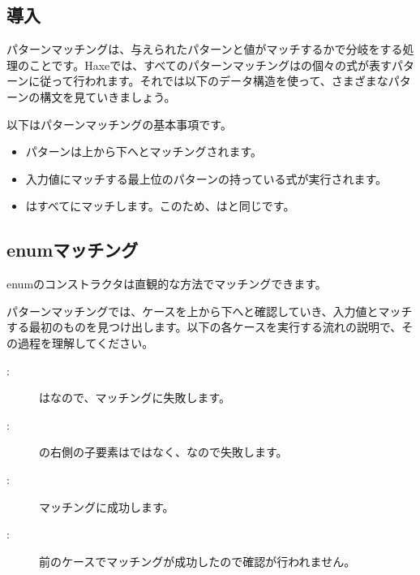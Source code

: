 \subsection{導入}
\label{lf-pattern-matching-introduction}

パターンマッチングは、与えられたパターンと値がマッチするかで分岐をする処理のことです。Haxeでは、すべてのパターンマッチングはの個々の式が表すパターンに従って行われます。それでは以下のデータ構造を使って、さまざまなパターンの構文を見ていきましょう。


以下はパターンマッチングの基本事項です。

\begin{itemize}
	\item パターンは上から下へとマッチングされます。
	\item 入力値にマッチする最上位のパターンの持っている式が実行されます。
	\item \expr{_}はすべてにマッチします。このため、はと同じです。
\end{itemize}

\subsection{enumマッチング}
\label{lf-pattern-matching-enums}

enumのコンストラクタは直観的な方法でマッチングできます。


パターンマッチングでは、ケースを上から下へと確認していき、入力値とマッチする最初のものを見つけ出します。以下の各ケースを実行する流れの説明で、その過程を理解してください。

\begin{description}
	\item[:] はなので、マッチングに失敗します。
	\item[:] の右側の子要素はではなく、なので失敗します。
	\item[:] マッチングに成功します。
	\item[:] 前のケースでマッチングが成功したので確認が行われません。
\end{description}

